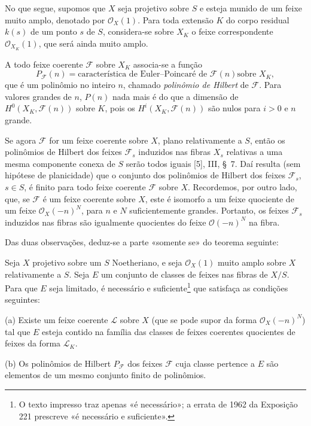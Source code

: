 
No que segue, supomos que $X$ seja projetivo sobre $S$ e esteja munido de um
feixe muito amplo, denotado por $\mathcal O_X(1)$. Para toda extensão $K$ do
corpo residual $k(s)$ de um ponto $s$ de $S$, considera-se sobre $X_K$ o feixe
correspondente $\mathcal O_{X_K}(1)$, que será ainda muito amplo.

A todo feixe coerente $\mathcal F$ sobre $X_K$ associa-se a função
\[
P_{\mathcal F}(n)=\text{característica de Euler--Poincaré de $\mathcal F(n)$
sobre $X_K$},
\]
que é um polinômio no inteiro $n$, chamado \emph{polinômio de Hilbert} de
$\mathcal F$. Para valores grandes de $n$, $P(n)$ nada mais é do que a
dimensão de $H^0(X_K,\mathcal F(n))$ sobre $K$, pois os
$H^i(X_K,\mathcal F(n))$ são nulos para $i>0$ e $n$ grande.

Se agora $\mathcal F$ for um feixe coerente sobre $X$, plano relativamente a
$S$, então os polinômios de Hilbert dos feixes $\mathcal F_s$ induzidos nas
fibras $X_s$ relativas a uma mesma componente conexa de $S$ serão todos iguais
[5], III, \S~7. Daí resulta (sem hipótese de planicidade) que o conjunto dos
polinômios de Hilbert dos feixes $\mathcal F_s$, $s\in S$, é finito para
todo feixe coerente $\mathcal F$ sobre $X$.
Recordemos, por outro lado, que, se $\mathcal F$ é um feixe coerente sobre $X$,
este é isomorfo a um feixe quociente de um feixe $\mathcal O_X(-n)^N$, para
$n$ e $N$ suficientemente grandes. Portanto, os feixes $\mathcal F_s$
induzidos nas fibras são igualmente quocientes do feixe $\mathcal O(-n)^N$ na
fibra.

Das duas observações, deduz-se a parte «somente se» do teorema seguinte:

 Seja $X$ projetivo sobre um $S$ Noetheriano, e seja
$\mathcal O_X(1)$ muito amplo sobre $X$ relativamente a $S$. Seja $E$ um
conjunto de classes de feixes nas fibras de $X/S$. Para que $E$ seja limitado,
é necessário e suficiente\footnote{O texto impresso traz apenas «é necessário»;
a errata de 1962 da Exposição 221 prescreve «é necessário e suficiente».} que
satisfaça as condições seguintes:

\medskip
\noindent (a) Existe um feixe coerente $\mathcal L$ sobre $X$ (que se pode
supor da forma $\mathcal O_X(-n)^N$) tal que $E$ esteja contido na família das
classes de feixes coerentes quocientes de feixes da forma $\mathcal L_K$.

\smallskip
\noindent (b) Os polinômios de Hilbert $P_{\mathcal F}$ dos feixes
$\mathcal F$ cuja classe pertence a $E$ são elementos de um mesmo conjunto
finito de polinômios.

